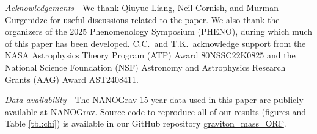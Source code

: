\documentclass[prd,twocolumn,aps,psfig,nofootinbib,nobibnotes,superscriptaddress,preprintnumbers,times]{revtex4-2}
\begin{document}
\vspace{5mm}
\textit{Acknowledgements}---We thank Qiuyue Liang, Neil Cornish, and Murman Gurgenidze for useful discussions related to the paper. We also thank the organizers of the 2025 Phenomenology Symposium (PHENO), during which much of this paper has been developed. C.C.\ and T.K.\ acknowledge support from the NASA Astrophysics Theory Program (ATP) Award 80NSSC22K0825 and the National Science Foundation (NSF) Astronomy and Astrophysics Research Grants (AAG) Award AST2408411.

\vspace{5mm}
\textit{Data availability}---The NANOGrav 15-year data used in this paper are publicly available at NANOGrav. Source code to reproduce all of our results (figures and Table \ref{tbl:chi}) is available in our GitHub repository \href{https://github.com/ChrisChoi314/graviton_mass_ORF}{graviton\_mass\_ORF}.





\clearpage
\end{document}
